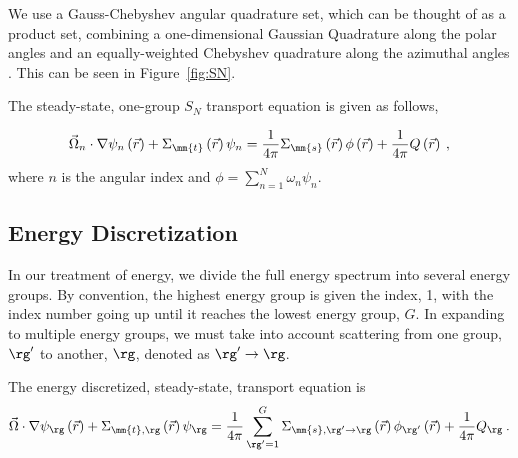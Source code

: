 \DIFdelend %
We use a Gauss-Chebyshev angular quadrature set, which can be thought of as a product set, combining a one-dimensional Gaussian Quadrature along the polar angles and an equally-weighted Chebyshev quadrature along the azimuthal angles \cite{jarrel-thesis}. This can be seen in Figure~\ref{fig:SN}. 

The steady-state, one-group $S_N$ transport equation is given as follows,
\DIFdelbegin %

\DIFdelend %
 \begin{equation}
  \vec{\Omega}_n \cdot \nabla \psi_n \left(\vec{r}\right)+ \Sigma_{\mm{t}}\left(\vec{r}\right)\psi_n = \frac{1}{4 \pi} \Sigma_{\mm{s}}\left(\vec{r}\right) \phi\left(\vec{r}\right) + \frac{1}{4 \pi} Q\left(\vec{r}\right)\:,
  \label{eq:transport-angular}
 \end{equation}
where $n$ is the angular index and $\phi = \sum\limits_{n=1}^N \omega_n \psi_n$.

\subsection{Energy Discretization}
In our treatment of energy, we divide the full energy spectrum into several energy groups. By convention, the highest energy group is given the index, 1, with the index number going up until it reaches the lowest energy group, $G$. In expanding to multiple energy groups, we must take into account scattering from one group, $\rg'$ to another, $\rg$, denoted as $\rg' \rightarrow \rg $. 

The energy discretized, steady-state, transport equation is
%
 \begin{equation}
  \vec{\Omega} \cdot \nabla \psi_\rg \left(\vec{r}\right)+ \Sigma_{\mm{t}, \rg}\left(\vec{r}\right)\psi_\rg = \frac{1}{4 \pi} \sum\limits_{\rg'=1}^{G}\Sigma_{\mm{s}, \rg' \rightarrow \rg}\left(\vec{r}\right) \phi_{\rg'}\left(\vec{r}\right) + \frac{1}{4 \pi} Q_\rg\:.
  \label{eq:transport-energy}
 \end{equation}


